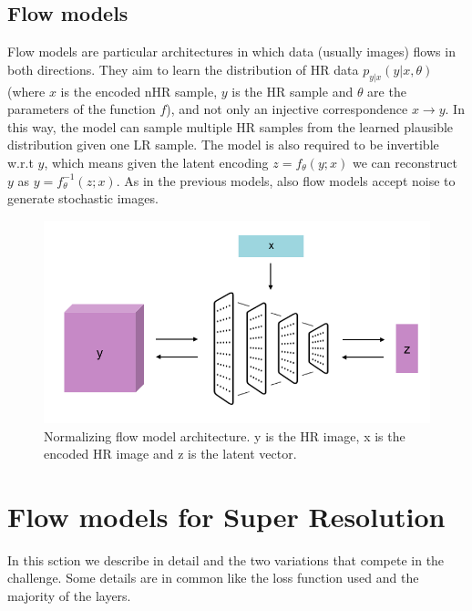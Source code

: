 \documentclass{article}
\begin{document}
\subsection{Flow models}
Flow models are particular architectures in which data (usually images) flows in both directions. They aim to learn the distribution of HR data $p_{y|x}(y|x, \theta)$ (where $x$ is the encoded nHR sample, $y$ is the HR sample and $\theta$ are the parameters of the function $f$), and not only an injective correspondence $x \rightarrow y$. In this way, the model can sample multiple HR samples from the learned plausible distribution given one LR sample. The model is also required to be invertible w.r.t $y$, which means given the latent encoding $z = f_{\theta}(y;x)$ we can reconstruct $y$ as $y = f_{\theta}^{-1}(z;x)$. As in the previous models, also flow models accept noise to generate stochastic images.
\begin{figure}[h]
    \centering
    \includegraphics[scale=.6]{flow.png}
    \caption{Normalizing flow model architecture. y is the HR image, x is the encoded HR image and z is the latent vector.}
    \label{img:vae}
\end{figure}


\newpage
\section{Flow models for Super Resolution}\label{sec:model} %
In this sction we describe in detail \cite{srFlow} and the two variations \cite{srFlow-da,ncsr} that compete in the challenge. Some details are in common like the loss function used and the majority of the layers.
\end{document}
